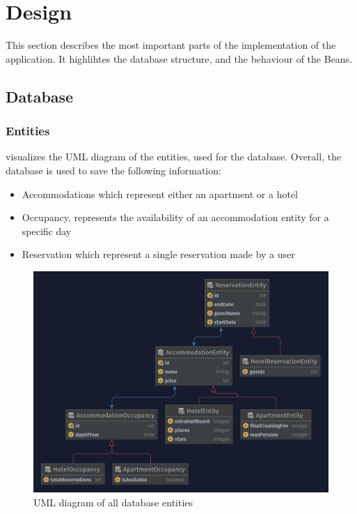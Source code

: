 \section{Design}\label{sec:02_impl}
This section describes the most important parts of the implementation of the application. It highlihtes the database structure, and the behaviour of the Beans.


\subsection{Database}\label{sec:02_impl_db}


\subsubsection{Entities}\label{sec:02_impl_db_entities}
 visualizes the UML diagram of the entities, used for the database.
Overall, the database is used to save the following information:
\begin{itemize}
\item Accommodations which represent either an apartment or a hotel
\item Occupancy, represents the availability of an accommodation entity for a specific day
\item Reservation which represent a single reservation made by a user
\end{itemize}

\begin{figure}[h]
\centering
\includegraphics[scale=0.3]{images/02_impl/entities}
\caption{UML diagram of all database entities}
\label{fig:02_impl_db_entities}
\end{figure}

